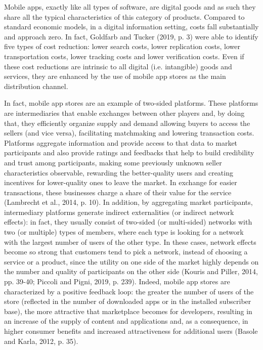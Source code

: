 Mobile apps, exactly like all types of software, are digital goods and as such they share all the typical characteristics of this category of products. Compared to standard economic models, in a digital information setting, costs fall substantially and approach zero. In fact, Goldfarb and Tucker (2019, p. 3) were able to identify five types of cost reduction: lower search costs, lower replication costs, lower transportation costs, lower tracking costs and lower verification costs. Even if these cost reductions are intrinsic to all digital (i.e. intangible) goods and services, they are enhanced by the use of mobile app stores as the main distribution channel. 

In fact, mobile app stores are an example of two-sided platforms. These platforms are intermediaries that enable exchanges between other players and, by doing that, they efficiently organize supply and demand allowing buyers to access the sellers (and vice versa), facilitating matchmaking and lowering transaction costs. Platforms aggregate information and provide access to that data to market participants and also provide ratings and feedbacks that help to build credibility and trust among participants, making some previously unknown seller characteristics observable, rewarding the better-quality users and creating incentives for lower-quality ones to leave the market. In exchange for easier transactions, these businesses charge a share of their value for the service (Lambrecht et al., 2014, p. 10). In addition, by aggregating market participants, intermediary platforms generate indirect externalities (or indirect network effects): in fact, they usually consist of two-sided (or multi-sided) networks with two (or multiple) types of members, where each type is looking for a network with the largest number of users of the other type. In these cases, network effects become so strong that customers tend to pick a network, instead of choosing a service or a product, since the utility on one side of the market highly depends on the number and quality of participants on the other side (Kouris and Piller, 2014, pp. 39-40; Piccoli and Pigni, 2019, p. 239). Indeed, mobile app stores are characterized by a positive feedback loop: the greater the number of users of the store (reflected in the number of downloaded apps or in the installed subscriber base), the more attractive that marketplace becomes for developers, resulting in an increase of the supply of content and applications and, as a consequence, in higher consumer benefits and increased attractiveness for additional users (Basole and Karla, 2012, p. 35).

